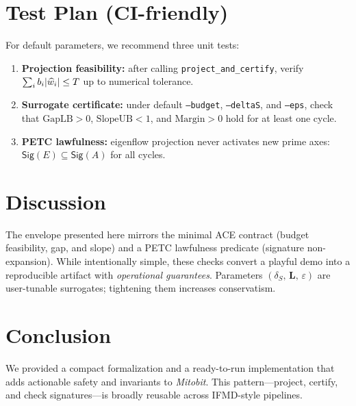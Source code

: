 \documentclass[11pt]{article}
\DeclarePairedDelimiter{\abs}{\lvert}{\rvert}
\newcommand{\LL}{\bm{L}}
\newcommand{\Tbudget}{T}
\newcommand{\GapLB}{\mathrm{GapLB}}
\newcommand{\SlopeUB}{\mathrm{SlopeUB}}
\newcommand{\Margin}{\mathrm{Margin}}
\begin{document}
\section{Test Plan (CI-friendly)}
\label{sec:tests}
For default parameters, we recommend three unit tests:
\begin{enumerate}[leftmargin=2.2em]
  \item \textbf{Projection feasibility:} after calling \texttt{project\_and\_certify}, verify $\sum_i b_i\abs{\widehat{w}_i}\le \Tbudget$ up to numerical tolerance.
  \item \textbf{Surrogate certificate:} under default \texttt{--budget}, \texttt{--deltaS}, and \texttt{--eps}, check that $\GapLB>0$, $\SlopeUB<1$, and $\Margin>0$ hold for at least one cycle.
  \item \textbf{PETC lawfulness:} eigenflow projection never activates new prime axes: $\mathsf{Sig}(E)\subseteq\mathsf{Sig}(A)$ for all cycles.
\end{enumerate}

\section{Discussion}
The envelope presented here mirrors the minimal ACE contract (budget feasibility, gap, and slope) and a PETC lawfulness predicate (signature non-expansion). While intentionally simple, these checks convert a playful demo into a reproducible artifact with \emph{operational guarantees}. Parameters $(\delta_S,\,\LL,\,\varepsilon)$ are user-tunable surrogates; tightening them increases conservatism.

\section{Conclusion}
We provided a compact formalization and a ready-to-run implementation that adds actionable safety and invariants to \emph{Mitobit}. This pattern---project, certify, and check signatures---is broadly reusable across IFMD-style pipelines.


\nocite{*}


\end{document}
